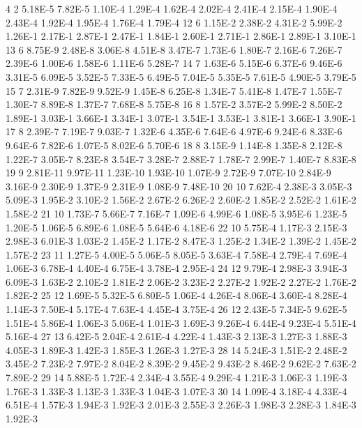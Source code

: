     4 2 	5.18E-5 	7.82E-5 	1.10E-4 	1.29E-4 	1.62E-4 	2.02E-4 	2.41E-4 	2.15E-4 	1.90E-4 	2.43E-4 	1.92E-4 	1.95E-4 	1.76E-4 	1.79E-4
    12 6 	1.15E-2 	2.38E-2 	4.31E-2 	5.99E-2 	1.26E-1 	2.17E-1 	2.87E-1 	2.47E-1 	1.84E-1 	2.60E-1 	2.71E-1 	2.86E-1 	2.89E-1 	3.10E-1
    13 6 	8.75E-9 	2.48E-8 	3.06E-8 	4.51E-8 	3.47E-7 	1.73E-6 	1.80E-7 	2.16E-6 	7.26E-7 	2.39E-6 	1.00E-6 	1.58E-6 	1.11E-6 	5.28E-7
    14 7 	1.63E-6 	5.15E-6 	6.37E-6 	9.46E-6 	3.31E-5 	6.09E-5 	3.52E-5 	7.33E-5 	6.49E-5 	7.04E-5 	5.35E-5 	7.61E-5 	4.90E-5 	3.79E-5
    15 7 	2.31E-9 	7.82E-9 	9.52E-9 	1.45E-8 	6.25E-8 	1.34E-7 	5.41E-8 	1.47E-7 	1.55E-7 	1.30E-7 	8.89E-8 	1.37E-7 	7.68E-8 	5.75E-8
    16 8 	1.57E-2 	3.57E-2 	5.99E-2 	8.50E-2 	1.89E-1 	3.03E-1 	3.66E-1 	3.34E-1 	3.07E-1 	3.54E-1 	3.53E-1 	3.81E-1 	3.66E-1 	3.90E-1
    17 8 	2.39E-7 	7.19E-7 	9.03E-7 	1.32E-6 	4.35E-6 	7.64E-6 	4.97E-6 	9.24E-6 	8.33E-6 	9.64E-6 	7.82E-6 	1.07E-5 	8.02E-6 	5.70E-6
    18 8 	3.15E-9 	1.14E-8 	1.35E-8 	2.12E-8 	1.22E-7 	3.05E-7 	8.23E-8 	3.54E-7 	3.28E-7 	2.88E-7 	1.78E-7 	2.99E-7 	1.40E-7 	8.83E-8
    19 9 	2.81E-11 	9.97E-11 	1.23E-10 	1.93E-10 	1.07E-9 	2.72E-9 	7.07E-10 	2.84E-9 	3.16E-9 	2.30E-9 	1.37E-9 	2.31E-9 	1.08E-9 	7.48E-10
    20 10	7.62E-4 	2.38E-3 	3.05E-3 	5.09E-3 	1.95E-2 	3.10E-2 	1.56E-2 	2.67E-2 	6.26E-2 	2.60E-2 	1.85E-2 	2.52E-2 	1.61E-2 	1.58E-2
    21 10	1.73E-7 	5.66E-7 	7.16E-7 	1.09E-6 	4.99E-6 	1.08E-5 	3.95E-6 	1.23E-5 	1.20E-5 	1.06E-5 	6.89E-6 	1.08E-5 	5.64E-6 	4.18E-6
    22 10	5.75E-4 	1.17E-3 	2.15E-3 	2.98E-3 	6.01E-3 	1.03E-2 	1.45E-2 	1.17E-2 	8.47E-3 	1.25E-2 	1.34E-2 	1.39E-2 	1.45E-2 	1.57E-2
    23 11	1.27E-5 	4.00E-5 	5.06E-5 	8.05E-5 	3.63E-4 	7.58E-4 	2.79E-4 	7.69E-4 	1.06E-3 	6.78E-4 	4.40E-4 	6.75E-4 	3.78E-4 	2.95E-4
    24 12	9.79E-4 	2.98E-3 	3.94E-3 	6.09E-3 	1.63E-2 	2.10E-2 	1.81E-2 	2.06E-2 	3.23E-2 	2.27E-2 	1.92E-2 	2.27E-2 	1.76E-2 	1.82E-2
    25 12	1.69E-5 	5.32E-5 	6.80E-5 	1.06E-4 	4.26E-4 	8.06E-4 	3.60E-4 	8.28E-4 	1.14E-3 	7.50E-4 	5.17E-4 	7.63E-4 	4.45E-4 	3.75E-4
    26 12	2.43E-5 	7.34E-5 	9.62E-5 	1.51E-4 	5.86E-4 	1.06E-3 	5.06E-4 	1.01E-3 	1.69E-3 	9.26E-4 	6.44E-4 	9.23E-4 	5.51E-4 	5.16E-4
    27 13	6.42E-5 	2.04E-4 	2.61E-4 	4.22E-4 	1.43E-3 	2.13E-3 	1.27E-3 	1.88E-3 	4.05E-3 	1.89E-3 	1.42E-3 	1.85E-3 	1.26E-3 	1.27E-3
    28 14	5.24E-3 	1.51E-2 	2.48E-2 	3.45E-2 	7.23E-2 	7.97E-2 	8.04E-2 	8.39E-2 	9.45E-2 	9.43E-2 	8.46E-2 	9.62E-2 	7.63E-2 	7.89E-2
    29 14	5.88E-5 	1.72E-4 	2.34E-4 	3.55E-4 	9.29E-4 	1.21E-3 	1.06E-3 	1.19E-3 	1.76E-3 	1.33E-3 	1.13E-3 	1.33E-3 	1.04E-3 	1.07E-3
    30 14	1.09E-4 	3.18E-4 	4.33E-4 	6.51E-4 	1.57E-3 	1.94E-3 	1.92E-3 	2.01E-3 	2.55E-3 	2.26E-3 	1.98E-3 	2.28E-3 	1.84E-3 	1.92E-3

